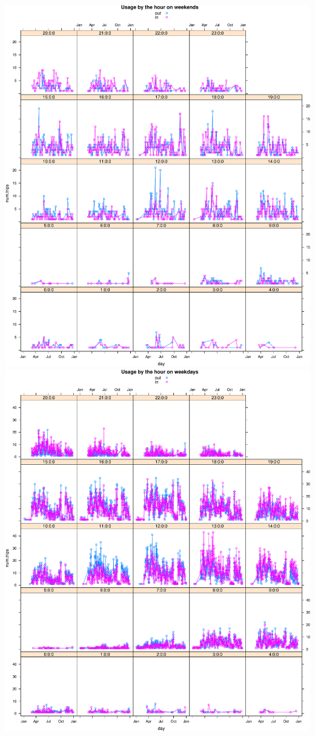 \documentclass[]{article}
\begin{document}
\includegraphics{velopassBirdsEye_files/figure-latex/dailyusagebythehour-1.pdf}
\includegraphics{velopassBirdsEye_files/figure-latex/dailyusagebythehour-2.pdf}
\end{document}
